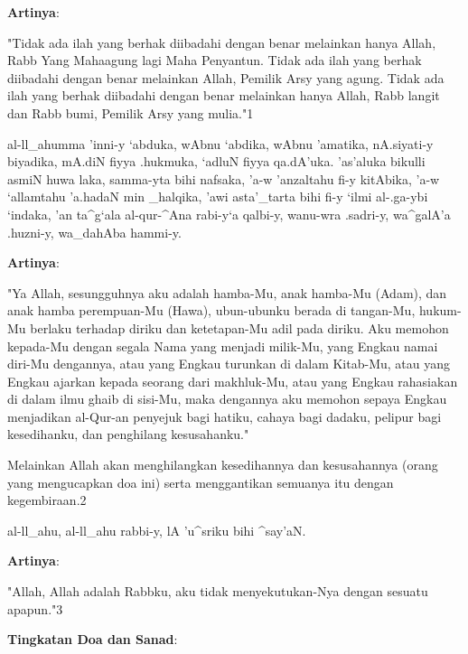 \documentclass[a4paper,12pt]{article}
\begin{document}
\noindent
\textbf{Artinya}:
\par
\indent
"Tidak ada ilah yang berhak diibadahi dengan benar melainkan hanya Allah, 
Rabb Yang Mahaagung lagi Maha Penyantun. Tidak ada ilah yang berhak 
diibadahi dengan benar melainkan Allah, Pemilik Arsy yang agung. Tidak ada 
ilah yang berhak diibadahi dengan benar melainkan hanya Allah, Rabb langit 
dan Rabb bumi, Pemilik Arsy yang mulia."{\scriptsize 1}\\
\begin{arabtext}
\noindent
al-ll_ahumma 'inni-y `abduka, wAbnu `abdika, wAbnu 'amatika, nA.siyati-y 
biyadika, mA.diN fiyya .hukmuka, `adluN fiyya qa.dA'uka. 'as'aluka bikulli 
asmiN huwa laka, samma-yta bihi nafsaka, 'a-w 'anzaltahu fi-y kitAbika, 
'a-w `allamtahu 'a.hadaN min _halqika, 'awi asta'_tarta bihi fi-y `ilmi 
al-.ga-ybi `indaka, 'an ta^g`ala al-qur-^Ana rabi-y`a qalbi-y, wanu-wra 
.sadri-y, wa^galA'a .huzni-y, wa_dahAba hammi-y.\\
\end{arabtext}
\noindent
\textbf{Artinya}:
\par
\indent
"Ya Allah, sesungguhnya aku adalah hamba-Mu, anak hamba-Mu (Adam), dan anak
hamba perempuan-Mu (Hawa), ubun-ubunku berada di tangan-Mu, hukum-Mu 
berlaku terhadap diriku dan ketetapan-Mu adil pada diriku. Aku memohon 
kepada-Mu dengan segala Nama yang menjadi milik-Mu, yang Engkau namai 
diri-Mu dengannya, atau yang Engkau turunkan di dalam Kitab-Mu, atau yang 
Engkau ajarkan kepada seorang dari makhluk-Mu, atau yang Engkau rahasiakan 
di dalam ilmu ghaib di sisi-Mu, maka dengannya aku memohon sepaya Engkau 
menjadikan al-Qur-an penyejuk bagi hatiku, cahaya bagi dadaku, pelipur bagi
kesedihanku, dan penghilang kesusahanku."
\begin{shaded*}
\noindent
Melainkan Allah akan menghilangkan kesedihannya dan kesusahannya (orang 
yang mengucapkan doa ini) serta menggantikan semuanya itu dengan 
kegembiraan.{\scriptsize 2}
\end{shaded*}
\begin{arabtext}
\noindent
al-ll_ahu, al-ll_ahu rabbi-y, lA 'u^sriku bihi ^say'aN.\\
\end{arabtext}
\noindent
\textbf{Artinya}:
\par
\indent
"Allah, Allah  adalah Rabbku, aku tidak menyekutukan-Nya dengan sesuatu 
apapun."{\scriptsize 3}\\
\par
\noindent
\textbf{Tingkatan Doa dan Sanad}:
\end{document}
